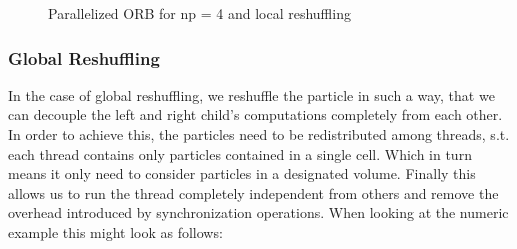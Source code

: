 \documentclass[]{article}
\begin{document}
\begin{figure}[H]
	\begin{center}
	\end{center}
	\caption{Parallelized ORB for np = 4 and local reshuffling}
	\label{fig:orb_parallel}
\end{figure}

\subsubsection{Global Reshuffling}

In the case of global reshuffling, we reshuffle the particle in such a way, that we can decouple the left and right child's computations completely from each other. In order to achieve this, the particles need to be redistributed among threads, s.t. each thread contains only particles contained in a single cell. Which in turn means it only need to consider particles in a designated volume. Finally this allows us to run the thread completely independent from others and remove the overhead introduced by synchronization operations.
When looking at the numeric example this might look as follows:
\end{document}
